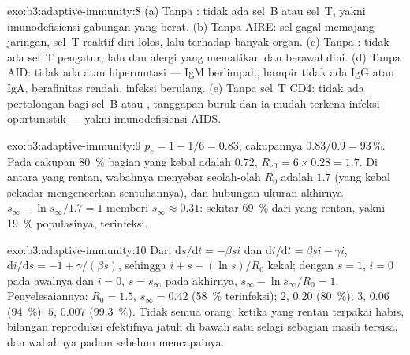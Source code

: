 \begin{solution}{exo:b3:adaptive-immunity:8}
(a) Tanpa : tidak ada sel~B atau sel~T, yakni imunodefisiensi
gabungan yang berat. (b) Tanpa AIRE: sel  gagal memajang 
jaringan, sel~T reaktif diri lolos, lalu  terhadap banyak
organ. (c) Tanpa : tidak ada sel~T pengatur, lalu  dan alergi
yang mematikan dan berawal dini. (d) Tanpa AID: tidak ada  atau
hipermutasi --- IgM berlimpah, hampir tidak ada IgG atau IgA, 
berafinitas rendah, infeksi berulang. (e) Tanpa sel~T CD4: tidak ada pertolongan bagi
sel~B atau , tanggapan  buruk dan ia mudah terkena
infeksi oportunistik --- yakni imunodefisiensi AIDS.
\end{solution}

\begin{solution}{exo:b3:adaptive-immunity:9}
$p_{c} = 1 - 1/6 = 0.83$; cakupannya $0.83/0.9 = 93\,\%$. Pada cakupan \qty{80}{\%}
bagian yang kebal adalah $0.72$, $R_{\text{eff}} = 6\times 0.28
= 1.7$. Di antara yang rentan, wabahnya menyebar seolah-olah $R_{0}$ adalah
$1.7$ (yang kebal sekadar mengencerkan sentuhannya), dan hubungan ukuran
akhirnya $s_{\infty} - \ln s_{\infty}/1.7 = 1$ memberi $s_{\infty}
\approx 0.31$: sekitar \qty{69}{\%} dari yang rentan, yakni \qty{19}{\%}
populasinya, terinfeksi.
\end{solution}

\begin{solution}{exo:b3:adaptive-immunity:10}
Dari $\mathrm{d}s/\mathrm{d}t = -\beta si$ dan $\mathrm{d}i/\mathrm{d}t
= \beta si - \gamma i$, $\mathrm{d}i/\mathrm{d}s = -1 + \gamma/(\beta s)$,
sehingga $i + s - (\ln s)/R_{0}$ kekal; dengan $s = 1$, $i = 0$ pada
awalnya dan $i = 0$, $s = s_{\infty}$ pada akhirnya, $s_{\infty} - \ln
s_{\infty}/R_{0} = 1$. Penyelesaiannya: $R_{0} = 1.5$, $s_{\infty} = 0.42$
(\qty{58}{\%} terinfeksi); $2$, $0.20$ (\qty{80}{\%}); $3$, $0.06$
(\qty{94}{\%}); $5$, $0.007$ (\qty{99.3}{\%}). Tidak semua orang: ketika
yang rentan terpakai habis, bilangan reproduksi efektifnya jatuh di bawah
satu selagi sebagian masih tersisa, dan wabahnya padam sebelum mencapainya.
\end{solution}


